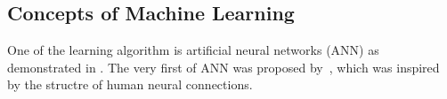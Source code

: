 \subsection{Concepts of Machine Learning}
One of the learning algorithm is artificial neural networks (ANN) as demonstrated in . The very first of ANN was proposed by~\citet{McCulloch_1943}, which was inspired by the structre of human neural connections. 